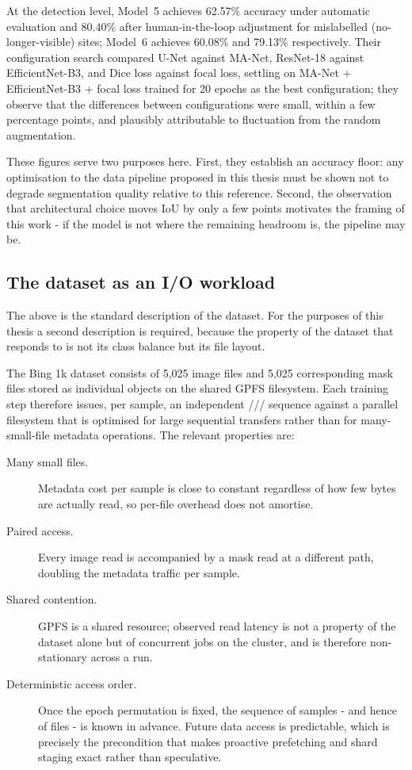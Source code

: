 At the detection level, Model~5 achieves 62.57\% accuracy under automatic evaluation
and 80.40\% after human-in-the-loop adjustment for mislabelled (no-longer-visible)
sites; Model~6 achieves 60.08\% and 79.13\% respectively.
Their configuration search compared U-Net against MA-Net, ResNet-18 against
EfficientNet-B3, and Dice loss against focal loss, settling on
MA-Net + EfficientNet-B3 + focal loss trained for 20 epochs as the best
configuration; they observe that the differences between configurations were small,
within a few percentage points, and plausibly attributable to fluctuation from the
random augmentation.

These figures serve two purposes here.
First, they establish an accuracy floor: any optimisation to the data pipeline
proposed in this thesis must be shown not to degrade segmentation quality relative
to this reference.
Second, the observation that architectural choice moves IoU by only a few points
motivates the framing of this work - if the model is not where the remaining
headroom is, the pipeline may be.

\subsection{The dataset as an I/O workload}
\label{sec:io-workload}

The above is the standard description of the dataset.
For the purposes of this thesis a second description is required, because the
property of the dataset that \pads{} responds to is not its class balance but its
file layout.

The Bing 1k dataset consists of 5{,}025 image files and 5{,}025 corresponding mask
files stored as individual objects on the shared GPFS filesystem.
Each training step therefore issues, per sample, an independent
/// sequence against a parallel
filesystem that is optimised for large sequential transfers rather than for
many-small-file metadata operations.
The relevant properties are:

\begin{description}
  \item[Many small files.] Metadata cost per sample is close to constant regardless
    of how few bytes are actually read, so per-file overhead does not amortise.
  \item[Paired access.] Every image read is accompanied by a mask read at a
    different path, doubling the metadata traffic per sample.
  \item[Shared contention.] GPFS is a shared resource; observed read latency is not
    a property of the dataset alone but of concurrent jobs on the cluster, and is
    therefore non-stationary across a run.
  \item[Deterministic access order.] Once the epoch permutation is fixed, the
    sequence of samples - and hence of files - is known in advance.
    Future data access is predictable, which is precisely the precondition that
    makes proactive prefetching and shard staging exact rather than speculative.
\end{description}

